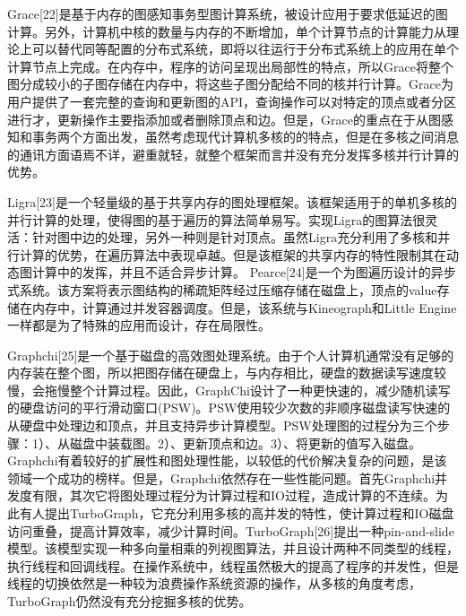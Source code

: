 Grace[22]是基于内存的图感知事务型图计算系统，被设计应用于要求低延迟的图计算。另外，计算机中核的数量与内存的不断增加，单个计算节点的计算能力从理论上可以替代同等配置的分布式系统，即将以往运行于分布式系统上的应用在单个计算节点上完成。在内存中，程序的访问呈现出局部性的特点，所以Grace将整个图分成较小的子图存储在内存中，将这些子图分配给不同的核并行计算。Grace为用户提供了一套完整的查询和更新图的API，查询操作可以对特定的顶点或者分区进行才，更新操作主要指添加或者删除顶点和边。但是，Grace的重点在于从图感知和事务两个方面出发，虽然考虑现代计算机多核的的特点，但是在多核之间消息的通讯方面语焉不详，避重就轻，就整个框架而言并没有充分发挥多核并行计算的优势。

Ligra[23]是一个轻量级的基于共享内存的图处理框架。该框架适用于的单机多核的并行计算的处理，使得图的基于遍历的算法简单易写。实现Ligra的图算法很灵活：针对图中边的处理，另外一种则是针对顶点。虽然Ligra充分利用了多核和并行计算的优势，在遍历算法中表现卓越。但是该框架的共享内存的特性限制其在动态图计算中的发挥，并且不适合异步计算。
Pearce[24]是一个为图遍历设计的异步式系统。该方案将表示图结构的稀疏矩阵经过压缩存储在磁盘上，顶点的value存储在内存中，计算通过并发容器调度。但是，该系统与Kineograph和Little Engine一样都是为了特殊的应用而设计，存在局限性。

Graphchi[25]是一个基于磁盘的高效图处理系统。由于个人计算机通常没有足够的内存装在整个图，所以把图存储在硬盘上，与内存相比，硬盘的数据读写速度较慢，会拖慢整个计算过程。因此，GraphChi设计了一种更快速的，减少随机读写的硬盘访问的平行滑动窗口(PSW)。PSW使用较少次数的非顺序磁盘读写快速的从硬盘中处理边和顶点，并且支持异步计算模型。PSW处理图的过程分为三个步骤：1）、从磁盘中装载图。2）、更新顶点和边。3）、将更新的值写入磁盘。Graphchi有着较好的扩展性和图处理性能，以较低的代价解决复杂的问题，是该领域一个成功的榜样。但是，Graphchi依然存在一些性能问题。首先Graphchi并发度有限，其次它将图处理过程分为计算过程和IO过程，造成计算的不连续。为此有人提出TurboGraph，它充分利用多核的高并发的特性，使计算过程和IO磁盘访问重叠，提高计算效率，减少计算时间。TurboGraph[26]提出一种pin-and-slide模型。该模型实现一种多向量相乘的列视图算法，并且设计两种不同类型的线程，执行线程和回调线程。在操作系统中，线程虽然极大的提高了程序的并发性，但是线程的切换依然是一种较为浪费操作系统资源的操作，从多核的角度考虑，TurboGraph仍然没有充分挖掘多核的优势。



